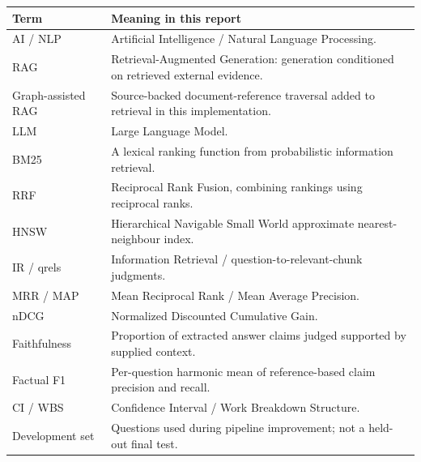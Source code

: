 \par\bigskip{}\par
{}
\begin{reporttable}
\begin{tabularx}{\textwidth}{lY}
\toprule\textbf{Term} & \textbf{Meaning in this report}\\\midrule
AI / NLP & Artificial Intelligence / Natural Language Processing.\\
RAG & Retrieval-Augmented Generation: generation conditioned on retrieved external evidence.\\
Graph-assisted RAG & Source-backed document-reference traversal added to retrieval in this implementation.\\
LLM & Large Language Model.\\
BM25 & A lexical ranking function from probabilistic information retrieval.\\
RRF & Reciprocal Rank Fusion, combining rankings using reciprocal ranks.\\
HNSW & Hierarchical Navigable Small World approximate nearest-neighbour index.\\
IR / qrels & Information Retrieval / question-to-relevant-chunk judgments.\\
MRR / MAP & Mean Reciprocal Rank / Mean Average Precision.\\
nDCG & Normalized Discounted Cumulative Gain.\\
Faithfulness & Proportion of extracted answer claims judged supported by supplied context.\\
Factual F1 & Per-question harmonic mean of reference-based claim precision and recall.\\
CI / WBS & Confidence Interval / Work Breakdown Structure.\\
Development set & Questions used during pipeline improvement; not a held-out final test.\\
\bottomrule
\end{tabularx}
\end{reporttable}
\clearpage
\listoftables{}
\clearpage
\listoffigures{}
\clearpage
{}
